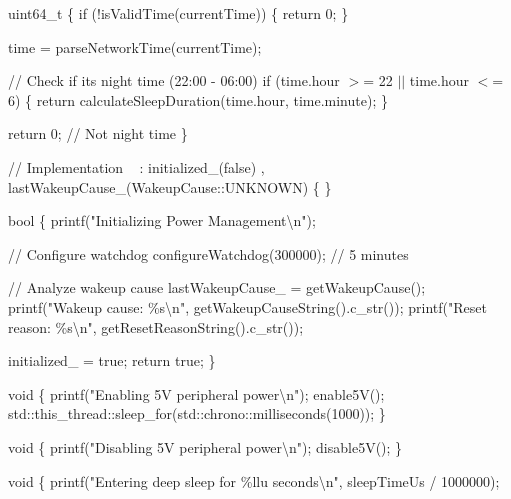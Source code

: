 uint64\+\_\+t  \{ if (!is\+Valid\+Time(current\+Time)) \{ return 0; \}

 time = parse\+Network\+Time(current\+Time);

// Check if it\textquotesingle{}s night time (22\+:00 -\/ 06\+:00) if (time.\+hour \texorpdfstring{$>$}{>}= 22 \texorpdfstring{$\vert$}{|}\texorpdfstring{$\vert$}{|} time.\+hour \texorpdfstring{$<$}{<}= 6) \{ return calculate\+Sleep\+Duration(time.\+hour, time.\+minute); \}

return 0; // Not night time \}

//  Implementation ~\newline
  \+: initialized\+\_\+(false) , last\+Wakeup\+Cause\+\_\+(\+Wakeup\+Cause\+::\+UNKNOWN) \{ \}

bool  \{ printf("{}\+Initializing Power Management\textbackslash{}n"{});

// Configure watchdog configure\+Watchdog(300000); // 5 minutes

// Analyze wakeup cause last\+Wakeup\+Cause\+\_\+ = get\+Wakeup\+Cause(); printf("{}\+Wakeup cause\+: \%s\textbackslash{}n"{}, get\+Wakeup\+Cause\+String().c\+\_\+str()); printf("{}\+Reset reason\+: \%s\textbackslash{}n"{}, get\+Reset\+Reason\+String().c\+\_\+str());

initialized\+\_\+ = true; return true; \}

void  \{ printf("{}\+Enabling 5\+V peripheral power\textbackslash{}n"{}); enable5\+V(); std\+::this\+\_\+thread\+::sleep\+\_\+for(std\+::chrono\+::milliseconds(1000)); \}

void  \{ printf("{}\+Disabling 5\+V peripheral power\textbackslash{}n"{}); disable5\+V(); \}

void  \{ printf("{}\+Entering deep sleep for \%llu seconds\textbackslash{}n"{}, sleep\+Time\+Us / 1000000);

